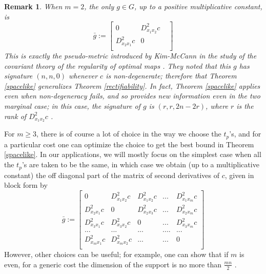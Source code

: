 \documentclass[letter,10pt]{article}
\theoremstyle{dotless}
\begin{document}
\newtheorem{comp2marg}[rectifiability]{Remark}
\begin{comp2marg}
When $m=2$, the only $g \in G$, up to a positive multiplicative constant, is 
\begin{equation*}\bar g:=
\begin{bmatrix}
0 & D^2_{x_1x_2}c & \\
D^2_{x_2x_1}c  & 0& \\
\end{bmatrix}
\end{equation*}
This is exactly the pseudo-metric introduced by Kim-McCann in the study of the covariant theory of the regularity of optimal maps \cite{KM}.  They noted that this $g$ has signature $(n,n,0)$ whenever $c$ is non-degenerate; therefore that Theorem \ref{spacelike} generalizes Theorem \ref{rectifiability}.  In fact, Theorem \ref{spacelike} applies even when non-degeneracy fails, and so provides new information even in the two marginal case; in this case, the signature of $g$ is $(r,r,2n-2r)$, where $r$ is the rank of  $ D^2_{x_1x_2}c$ \cite{P}.
\end{comp2marg}

For $m \geq 3$, there is of course a lot of choice in the way we choose the $t_p$'s, and for a particular cost one can optimize the choice to get the best bound in Theorem \ref{spacelike}.  In our applications, we will mostly focus on the simplest case when all the $t_p$'s are taken to be the same, in which case we obtain (up to a multiplicative constant) the off diagonal part of the matrix of second derivatives of $c$, given in block form by
\begin{equation*}\bar g:=
 \begin{bmatrix}
0 & D^2_{x_1x_2}c & D^2_{x_1x_2}c&...& D^2_{x_1x_m}c\\
D^2_{x_2x_1}c  & 0&D^2_{x_2x_3}c&...&D^2_{x_2x_m}c \\
D^2_{x_3x_1}c  & D^2_{x_3x_2}c& 0&...&D^2_{x_3x_m}c\\
...  & ...&...&....&... \\
D^2_{x_mx_1}c  & D^2_{x_mx_2}c  &...&...&0 \\
\end{bmatrix}
\end{equation*}
However, other choices can be useful; for example, one can show that if $m$ is even, for a generic cost the dimension of the support is no more than $\frac{mn}{2}$ \cite{P}.
\end{document}
